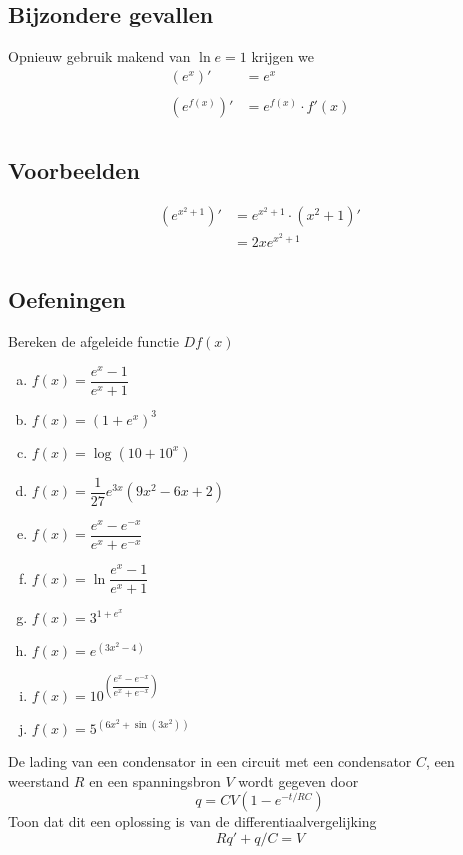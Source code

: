 \documentclass[12pt]{article}
\begin{document}
\subsection{Bijzondere gevallen}
Opnieuw gebruik makend van $\ln e=1$ krijgen we
\begin{align*}
  \left(e^x\right)' &= e^x\\\\
  \left(e^{f(x)}\right)' &= e^{f(x)} \cdot f'(x)\\
\end{align*}

\subsection{Voorbeelden}

\begin{align*}
\left(e^{x^2+1}\right)' &= e^{x^2+1} \cdot (x^2+1)'\\
                        &= 2x e^{x^2+1}\\
\end{align*}

\subsection{Oefeningen}

\begin{oefening}
Bereken de afgeleide functie $Df(x)$
\begin{multicols}{2}
\begin{enumerate}[(a)]
  \itemsep0.8em
  \item $f(x)=\dfrac{e^x-1}{e^x+1}$
  \item $f(x)=(1+e^x)^3$
  \item $f(x)=\log(10+10^x)$
  \item $f(x)=\dfrac{1}{27}e^{3x}(9x^2-6x+2)$
  \item $f(x)=\dfrac{e^x-e^{-x}}{e^x+e^{-x}}$
  \item $f(x)=\ln\dfrac{e^x-1}{e^x+1}$
  \item $f(x)=3^{1+e^x}$
  \item $f(x)=e^{(3x^2-4)}$
  \item $f(x)=10^{\left(\dfrac{e^x-e^{-x}}{e^x+e^{-x}}\right)}$
  \item $f(x)=5^{\left(6x^2+\sin(3x^2)\right)}$
\end{enumerate}
\end{multicols}
\end{oefening}

\begin{oefening} 
De lading van een condensator in een circuit met een condensator $C$, een weerstand $R$ en een spanningsbron $V$ wordt gegeven door
$$q=CV(1-e^{-t/RC})$$
Toon dat dit een oplossing is van de differentiaalvergelijking
$$Rq'+q/C=V$$
\end{oefening}
\end{document}

